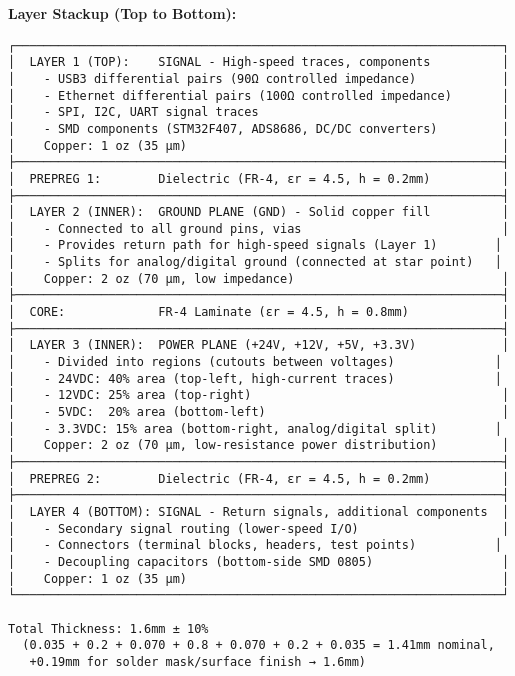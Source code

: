 \documentclass[
]{article}
\begin{document}
\textbf{Layer Stackup (Top to Bottom):}

\begin{verbatim}
┌────────────────────────────────────────────────────────────────────┐
│  LAYER 1 (TOP):    SIGNAL - High-speed traces, components          │
│    - USB3 differential pairs (90Ω controlled impedance)            │
│    - Ethernet differential pairs (100Ω controlled impedance)       │
│    - SPI, I2C, UART signal traces                                  │
│    - SMD components (STM32F407, ADS8686, DC/DC converters)         │
│    Copper: 1 oz (35 μm)                                            │
├────────────────────────────────────────────────────────────────────┤
│  PREPREG 1:        Dielectric (FR-4, εr = 4.5, h = 0.2mm)          │
├────────────────────────────────────────────────────────────────────┤
│  LAYER 2 (INNER):  GROUND PLANE (GND) - Solid copper fill          │
│    - Connected to all ground pins, vias                            │
│    - Provides return path for high-speed signals (Layer 1)        │
│    - Splits for analog/digital ground (connected at star point)   │
│    Copper: 2 oz (70 μm, low impedance)                             │
├────────────────────────────────────────────────────────────────────┤
│  CORE:             FR-4 Laminate (εr = 4.5, h = 0.8mm)             │
├────────────────────────────────────────────────────────────────────┤
│  LAYER 3 (INNER):  POWER PLANE (+24V, +12V, +5V, +3.3V)            │
│    - Divided into regions (cutouts between voltages)              │
│    - 24VDC: 40% area (top-left, high-current traces)              │
│    - 12VDC: 25% area (top-right)                                   │
│    - 5VDC:  20% area (bottom-left)                                 │
│    - 3.3VDC: 15% area (bottom-right, analog/digital split)        │
│    Copper: 2 oz (70 μm, low-resistance power distribution)         │
├────────────────────────────────────────────────────────────────────┤
│  PREPREG 2:        Dielectric (FR-4, εr = 4.5, h = 0.2mm)          │
├────────────────────────────────────────────────────────────────────┤
│  LAYER 4 (BOTTOM): SIGNAL - Return signals, additional components  │
│    - Secondary signal routing (lower-speed I/O)                    │
│    - Connectors (terminal blocks, headers, test points)           │
│    - Decoupling capacitors (bottom-side SMD 0805)                  │
│    Copper: 1 oz (35 μm)                                            │
└────────────────────────────────────────────────────────────────────┘

Total Thickness: 1.6mm ± 10%
  (0.035 + 0.2 + 0.070 + 0.8 + 0.070 + 0.2 + 0.035 = 1.41mm nominal,
   +0.19mm for solder mask/surface finish → 1.6mm)
\end{verbatim}
\end{document}
